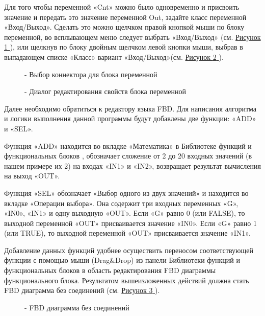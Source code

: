 \documentclass[letterpaper,10pt,russian]{sphinxmanual}
\begin{document}
Для того чтобы переменной «Cnt» можно было одновременно и присвоить
значение и передать это значение переменной Out, задайте класс
переменной «Вход/Выход». Сделать это можно щелчком правой кнопкой мыши
по блоку переменной, во всплывающем меню следует выбрать «Вход/Выход»
(см. \hyperref[usage_guide/work_with_project:image166]{Рисунок \ref{usage_guide/work_with_project:image166} }), или щелкнув по блоку двойным щелчком левой кнопки мыши,
выбрав в выпадающем списке «Класс» вариант «Вход/Выход»(см. \hyperref[usage_guide/work_with_project:image167]{Рисунок \ref{usage_guide/work_with_project:image167} }).
\begin{figure}[htbp]
\centering
\capstart

\noindent{}
\caption{- Выбор коннектора для блока переменной}\label{usage_guide/work_with_project:image166}\end{figure}
\begin{figure}[htbp]
\centering
\capstart

\noindent{}
\caption{- Диалог редактирования свойств блока переменной}\label{usage_guide/work_with_project:image167}\end{figure}

Далее необходимо обратиться к редактору языка FBD. Для написания
алгоритма и логики выполнения данной программы будут добавлены две
функции: «ADD» и «SEL».

Функция «ADD» находится во вкладке «Математика» в Библиотеке функций и
функциональных блоков , обозначает сложение от 2 до 20
входных значений (в нашем примере их 2) на входах «IN1» и «IN2»,
возвращает результат вычисления на выход «OUT».

Функция «SEL» обозначает «Выбор одного из двух значений» и находится во
вкладке «Операции выбора». Она содержит три входных переменных «G»,
«IN0», «IN1» и одну выходную «OUT». Если «G» равно 0 (или FALSE), то
выходной переменной «OUT» присваивается значение «IN0». Если «G» равно 1
(или TRUE), то выходной переменной «OUT» присваивается значение «IN1».

Добавление данных функций удобнее осуществить переносом соответствующей
функции с помощью мыши (Drag\&Drop) из панели Библиотеки функций и
функциональных блоков в область редактирования FBD диаграммы
функционального блока. Результатом вышеизложенных действий должна стать
FBD диаграмма без соединений (см. \hyperref[usage_guide/work_with_project:image168]{Рисунок \ref{usage_guide/work_with_project:image168} }).
\begin{figure}[htbp]
\centering
\capstart

\noindent{}
\caption{- FBD диаграмма без соединений}\label{usage_guide/work_with_project:image168}\end{figure}
\end{document}
